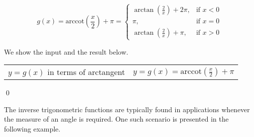 \documentclass[12pt]{ximera}
\begin{document}
\begin{example}
\begin{enumerate}
\begin{enumerate}
\[ g(x) = \text{arccot}\left(\frac{x}{2}\right) + \pi = \left\{ \begin{array}{rr} \arctan\left(\frac{2}{x}\right) + 2\pi, & \text{if $x<0$} \\ [5pt] \pi, & \text{if $x=0$} \\ [5pt] \arctan\left(\frac{2}{x}\right) + \pi, & \text{if $x>0$} \end{array}\right. \]

We show the input and the result below.

\smallskip

\begin{tabular}{cc}

 \\ 

$y=g(x)$ in terms of arctangent & \hspace{0.75in} $y = g(x) = \text{arccot}\left(\frac{x}{2}\right) + \pi $
\end{tabular} 

\end{enumerate}

\end{enumerate}

\qed
\end{example}






The inverse trigonometric functions are typically found in applications whenever the measure of an angle is required.  One such scenario is presented in the following example.
\end{document}
